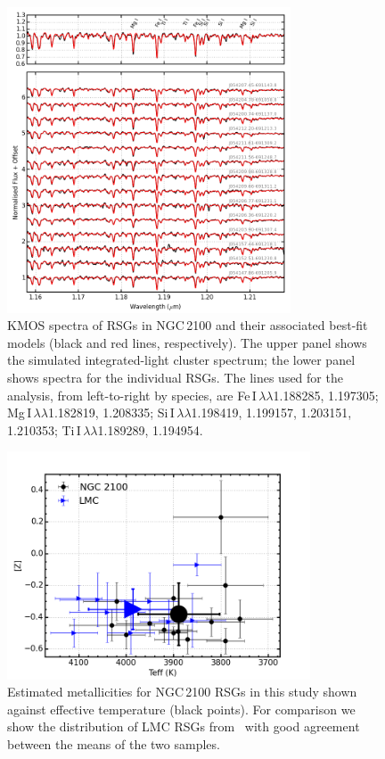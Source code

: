 \documentclass[useAMS,usenatbib]{mn2e}
\begin{document}
\begin{figure}
 \begin{center}
\includegraphics[width=0.75\textwidth]{NGC2100-model-fits}
\caption{KMOS spectra of RSGs in NGC\,2100 and their associated best-fit models
(black and red lines, respectively).
The upper panel shows the simulated integrated-light cluster spectrum;
the lower panel shows spectra for the individual RSGs.
The lines used for the analysis, from left-to-right by species, are
Fe\,{\scriptsize I}$\,\lambda\lambda$1.188285,
1.197305;
Mg\,{\scriptsize I}$\,\lambda\lambda$1.182819,
1.208335;
Si\,{\scriptsize I}$\,\lambda\lambda$1.198419,
1.199157,
1.203151,
1.210353;
Ti\,{\scriptsize I}$\,\lambda\lambda$1.189289,
1.194954.\label{fig:model_fits}}
\end{center}
\end{figure}

\begin{figure}
 \includegraphics[width=9.0cm]{NGC2100-TeffvsZ-2100-LMC}
 \caption{Estimated metallicities for NGC\,2100 RSGs in this study shown against effective temperature (black points).
        For comparison we show the distribution of LMC RSGs from~\citet[][blue triangles]{2015ApJ...806...21D} with good agreement between the means of the two samples.
\label{fig:TeffvsZ}
          }
\end{figure}
\end{document}
